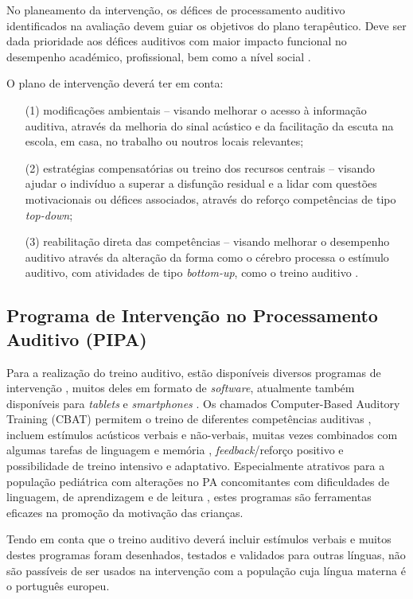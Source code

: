 \documentclass[output=paper,colorlinks,citecolor=brown,booklanguage=portuguese]{langscibook}
\begin{document}
No planeamento da intervenção, os défices de processamento auditivo identificados na avaliação devem guiar os objetivos do plano terapêutico. Deve ser dada prioridade aos défices auditivos com maior impacto funcional no desempenho académico, profissional, bem como a nível social \citep{AAA2010}.

O plano de intervenção deverá ter em conta: 

\begin{enumerate}
    \item [(1)] modificações ambientais – visando melhorar o acesso à informação auditiva, através da melhoria do sinal acústico e da facilitação da escuta na escola, em casa, no trabalho ou noutros locais relevantes; 
\item[(2)] estratégias compensatórias ou treino dos recursos centrais – visando ajudar o indivíduo a superar a disfunção residual e a lidar com questões motivacionais ou défices associados, através do reforço competências de tipo \emph{top-down}; 
\item [(3)] reabilitação direta das competências – visando melhorar o desempenho auditivo através da alteração da forma como o cérebro processa o estímulo auditivo, com atividades de tipo \emph{bottom-up}, como o treino auditivo \citep{Bellis2008}.
\end{enumerate}
\subsection{Programa de Intervenção no Processamento Auditivo (PIPA)}
Para a realização do treino auditivo, estão disponíveis diversos programas de intervenção \citep{Miller2005}, muitos deles em formato de \emph{software}, atualmente também disponíveis para \emph{tablets} e \emph{smartphones} \citep{BSA2018}. Os chamados Computer-Based Auditory Training (CBAT) permitem o trei\-no de diferentes competências auditivas \citep{Bellis2015, Keith2019}, incluem estímulos acústicos verbais e não-verbais, muitas vezes combinados com algumas tarefas de linguagem e memória \citep{Aquino2002a, Loo2010}, \emph{feedback}/reforço positivo e possibilidade de treino intensivo e adaptativo. Especialmente atrativos para a população pediátrica com alterações no PA concomitantes com dificuldades de linguagem, de aprendizagem e de leitura \citep{AAA2010, Loo2010}, estes programas são ferramentas eficazes na promoção da motivação das crianças.

Tendo em conta que o treino auditivo deverá incluir estímulos verbais \citep{AAA2010, Bellis2012} e muitos destes programas foram desenhados, testados e validados para outras línguas, não são passíveis de ser usados na intervenção com a população cuja língua materna é o português europeu.
\end{document}
